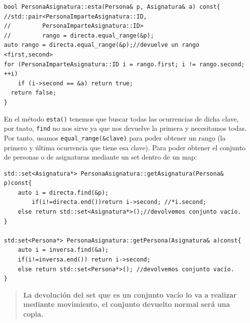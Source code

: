 \begin{center}
	\begin{lstlisting}[frame=single]
bool PersonaAsignatura::esta(Persona& p, Asignatura& a) const{ 
//std::pair<PersonaImparteAsignatura::ID,
//         PersonaImparteAsignatura::ID>
//         rango = directa.equal_range(&p);
auto rango = directa.equal_range(&p);//devuelve un rango <first,second>
for (PersonaImparteAsignatura::ID i = rango.first; i != rango.second; ++i)
    if (i->second == &a) return true;
  return false;
}
\end{lstlisting}
\end{center}
En el método \texttt {esta()} tenemos que buscar todas las ocurrencias de dicha clave, por tnato, \texttt{find} no nos sirve ya que nos devuelve la primera y necesitamos todas. Por tanto, usamos \texttt{equal\_range(&clave)}
 para poder obtener un rango (la primero y última ocurrencia que tiene esa clave).
Para poder obtener el conjunto de personas o de asignaturas mediante un set dentro de un map:
\begin{center}
	\begin{lstlisting}[frame=single]
std::set<Asignatura*> PersonaAsignatura::getAsignatura(Persona& p)const{
	auto i = directa.find(&p);
		if(i!=directa.end())return i->second; //*i.second;
	else return std::set<Asignatura*>();//devolvemos conjunto vacío.
}

std:set<Persona*> PersonaAsignatura::getPersona(Asignatura& a)const{
	auto i = inversa.find(&a);
	if(i!=inversa.end()) return i->second;
	else return std::set<Persona*>(); //devolvemos conjunto vacío.
}
\end{lstlisting}
\end{center}
\begin{quote}
	\textbf{La devolución del set que es un conjunto vacío lo va a realizar mediante movimiento, el conjunto devuelto normal será una copia.}
\end{quote}
\newpage
